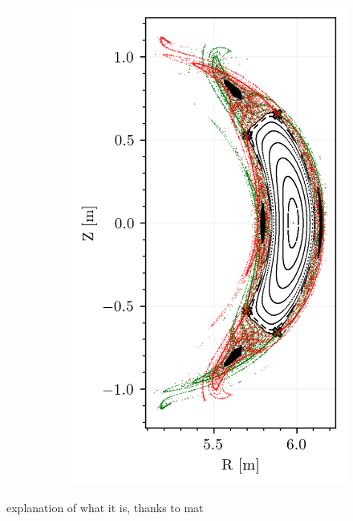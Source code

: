 \begin{figure}[h!]
\begin{subfigure}[c]{0.49\textwidth}
        \includegraphics[width=\textwidth]{images/w7x-gym00-1750/gym99_1750_fixedpoints.png}
        \caption{}
        \label{}
    \end{subfigure}
    \caption{}
    \label{}
\end{figure}

explanation of what it is, thanks to mat


